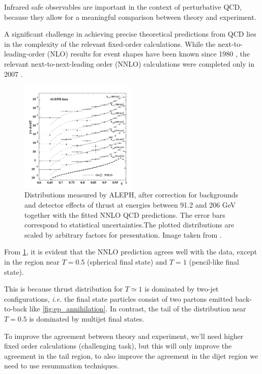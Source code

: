 \documentclass[../main.tex]{subfiles}
\begin{document}
Infrared safe observables are important in the context of perturbative QCD, because they allow for a meaningful comparison between theory and experiment. 

A significant challenge in achieving precise theoretical predictions from QCD lies in the complexity of the relevant fixed-order calculations. While the next-to-leading-order (NLO) results 
for event shapes have been known since 1980 \cite{Ellis:1980wv}, the relevant next-to-next-leading order (NNLO) calculations were completed only in 2007 \cite{Gehrmann-DeRidder:2007nzq}.

\begin{figure}[h]
    \centering
    \includegraphics[width=0.5\textwidth]{figures/LEP_Thrust_NNLO.png}
    \caption{Distributions measured by ALEPH, after correction for backgrounds and detector
    effects of thrust at energies between 91.2 and 206
    GeV together with the fitted NNLO QCD predictions. The error bars correspond to statistical
    uncertainties.The plotted
    distributions are scaled by arbitrary factors for presentation. Image taken from \cite{Dissertori_2008}.}
    \label{fig:LEP_Thrust_NNLO}
\end{figure}

From \cref{fig:LEP_Thrust_NNLO},  it is evident that the NNLO prediction agrees well with the data, except in the region near $T=0.5$ (spherical final state) and $T=1$ (pencil-like final state).

This is because thrust distribution for $T\simeq 1$ is dominated by two-jet configurations, \emph{i.e.} the final state particles consist of two partons emitted back-to-back like \cref{fig:ep_annihilation}.
In contrast, the tail of the distribution near $T= 0.5$ is dominated by multijet final states.

To improve the agreement between theory and experiment, we'll need higher fixed order calculations (challenging task), but this will only 
improve the agreement in the tail region, to also improve the agreement in the dijet region we need to use resummation techniques.
\end{document}
